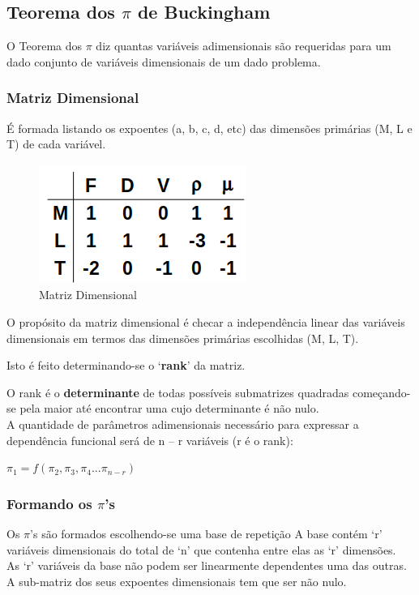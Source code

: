 \documentclass[a4paper, 12pt]{article}
\begin{document}
\subsection{Teorema dos $\pi$ de Buckingham}
	O Teorema dos $\pi$ diz quantas variáveis adimensionais são requeridas para um dado conjunto de variáveis dimensionais de um dado problema.
\subsubsection{Matriz Dimensional}
	É formada listando os expoentes (a, b, c, d, etc) das dimensões primárias (M, L e T) de cada variável.
	\begin{figure}[h]
		\centering
		\includegraphics[width=0.5\linewidth]{imagens/mat}
		\caption{Matriz Dimensional}
		\label{fig:mat}
	\end{figure}
	O propósito da matriz dimensional é checar a independência linear das variáveis dimensionais em termos das dimensões primárias escolhidas (M, L, T).
	
	
	Isto é feito determinando-se o ‘\textbf{rank}’ da matriz.
	
	O rank é o \textbf{determinante} de todas possíveis submatrizes quadradas começando-se pela maior até encontrar uma cujo determinante é não nulo.\\

	A quantidade de parâmetros adimensionais necessário para expressar a dependência funcional será de n – r variáveis (r é o rank):
	\begin{center}
		\Large
		$
		\pi_{1} = f(\pi_{2},\pi_{3},\pi_{4}...\pi_{n-r})
		$
	\end{center}
\subsubsection{Formando os $\pi$'s}
	Os $\pi$’s são formados escolhendo-se uma base de repetição
	A base contém ‘r’ variáveis dimensionais do total de ‘n’ que contenha entre elas as ‘r’ dimensões.\\
	
	As ‘r’ variáveis da base não podem ser linearmente dependentes uma das outras. A sub-matriz dos seus expoentes dimensionais tem que ser não nulo.
\end{document}
